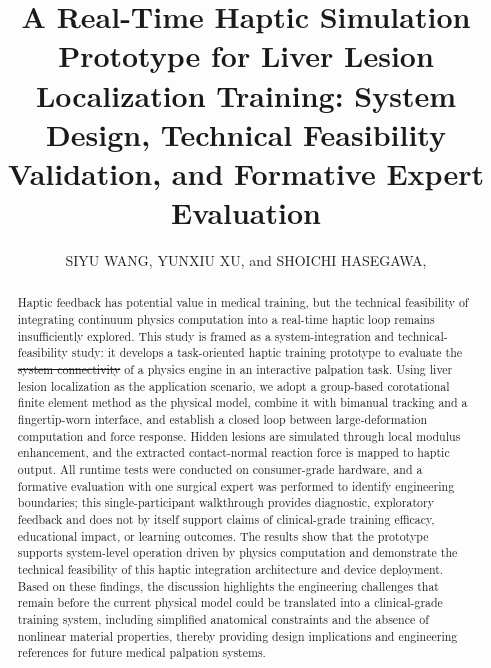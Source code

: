 \documentclass{ieeeaccess}
\makeatletter
\providecommand{\DIFadd}[1]{{\protect\color{blue}\uwave{#1}}} %
\providecommand{\DIFdel}[1]{{\protect\color{red}\sout{#1}}} %
\providecommand{\DIFaddbegin}{} %
\providecommand{\DIFaddend}{} %
\providecommand{\DIFdelbegin}{} %
\providecommand{\DIFdelend}{} %
\newcommand{\DIFscaledelfig}{0.5}
\newlength{\DIFdelgraphicswidth} %
\newlength{\DIFdelgraphicsheight} %
\newcommand{\DIFaddincludegraphics}[2][]{{\color{blue}\fbox{\DIFOincludegraphics[#1]{#2}}}} %
\newcommand{\DIFdelincludegraphics}[2][]{%
\sbox{\DIFdelgraphicsbox}{\DIFOincludegraphics[#1]{#2}}%
\settoboxwidth{\DIFdelgraphicswidth}{\DIFdelgraphicsbox} %
\settoboxtotalheight{\DIFdelgraphicsheight}{\DIFdelgraphicsbox} %
\scalebox{\DIFscaledelfig}{%
\parbox[b]{\DIFdelgraphicswidth}{\usebox{\DIFdelgraphicsbox}\\[-\baselineskip] \rule{\DIFdelgraphicswidth}{0em}}\llap{\resizebox{\DIFdelgraphicswidth}{\DIFdelgraphicsheight}{%
\setlength{\unitlength}{\DIFdelgraphicswidth}%
\begin{picture}(1,1)%
\thicklines\linethickness{2pt} %
{\color[rgb]{1,0,0}\put(0,0){\framebox(1,1){}}}%
{\color[rgb]{1,0,0}\put(0,0){\line( 1,1){1}}}%
{\color[rgb]{1,0,0}\put(0,1){\line(1,-1){1}}}%
\end{picture}%
}\hspace*{3pt}}} %
} %
\DeclareRobustCommand{\DIFaddbegin}{\DIFOaddbegin \let\includegraphics\DIFaddincludegraphics} %
\DeclareRobustCommand{\DIFaddend}{\DIFOaddend \let\includegraphics\DIFOincludegraphics} %
\DeclareRobustCommand{\DIFdelbegin}{\DIFOdelbegin \let\includegraphics\DIFdelincludegraphics} %
\DeclareRobustCommand{\DIFdelend}{\DIFOaddend \let\includegraphics\DIFOincludegraphics} %
\let\sout@orig\sout %
\renewcommand{\sout}[1]{\ifmmode\text{\sout@orig{\ensuremath{#1}}}\else\sout@orig{#1}\fi} %
\makeatother
\begin{document}

\title{A Real-Time Haptic Simulation Prototype for Liver Lesion Localization Training: System Design, Technical Feasibility Validation, and Formative Expert Evaluation}
\author{\uppercase{Siyu Wang},
\uppercase{Yunxiu Xu},
and \uppercase{Shoichi Hasegawa}, }
\address[1]{Department of Information and Communication Engineering, Institute of Science Tokyo, Yokohama, Japan (e-mail: siw131@haselab.net, yunxiu@haselab.net, hasevr@haselab.net)}

\begin{abstract}
Haptic feedback has potential value in medical training, but the technical feasibility of integrating continuum physics computation into a real-time haptic loop remains insufficiently explored. This study is framed as a system-integration and technical-feasibility study: it develops a task-oriented haptic training prototype to evaluate the \DIFdelbegin \DIFdel{system connectivity }\DIFdelend \DIFaddbegin \DIFadd{closed-loop system integration }\DIFaddend of a physics engine in an interactive palpation task. Using liver lesion localization as the application scenario, we adopt a group-based corotational finite element method as the physical model, combine it with bimanual tracking and a fingertip-worn interface, and establish a closed loop between large-deformation computation and force response. Hidden lesions are simulated through local modulus enhancement, and the extracted contact-normal reaction force is mapped to haptic output. All runtime tests were conducted on consumer-grade hardware, and a formative evaluation with one surgical expert was performed to identify engineering boundaries; this single-participant walkthrough provides diagnostic, exploratory feedback and does not by itself support claims of clinical-grade training efficacy, educational impact, or learning outcomes. The results show that the prototype supports system-level operation driven by physics computation and demonstrate the technical feasibility of this haptic integration architecture and device deployment. Based on these findings, the discussion highlights the engineering challenges that remain before the current physical model could be translated into a clinical-grade training system, including simplified anatomical constraints and the absence of nonlinear material properties, thereby providing design implications and engineering references for future medical palpation systems.
\end{abstract}
\end{document}
